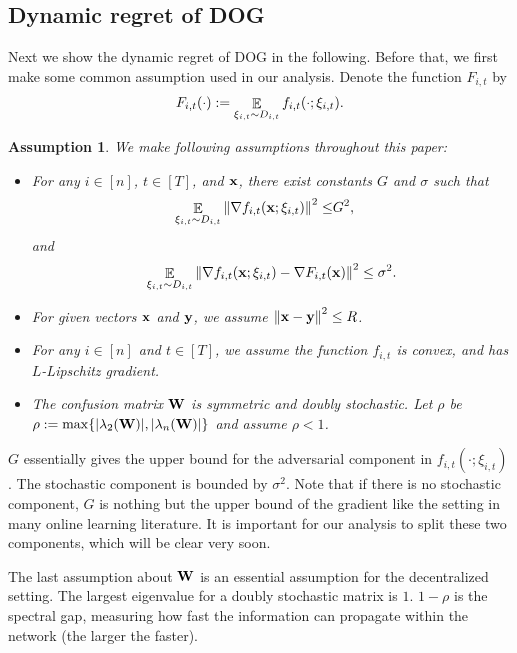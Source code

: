 \documentclass{article}
\newtheorem{Assumption}{\bf{Assumption}}
\begin{document}
\subsection{Dynamic regret of DOG}
\label{subsection_theoretical_analysis}
Next we show the dynamic regret of DOG in the following. Before that, we first make some common assumption used in our analysis. 
Denote the function $F_{i,t}$ by
\begin{align}
\nonumber
F_{i,t}(\cdot) := \mathop{\mathbb{E}}_{\xi_{i,t} \sim D_{i,t}} f_{i,t}(\cdot; \xi_{i,t}).
\end{align}

\begin{Assumption}
\label{assumption_bounded_gradient_domain}
We make following assumptions throughout this paper:
\begin{itemize}
\item For any $i\in[n]$, $t\in[T]$, and ${\bf x}$, there exist constants $G$ and $\sigma$ such that
\begin{align}
\nonumber
\mathop{\mathbb{E}}_{ \xi_{i,t} \sim D_{i,t} }\left\lVert\nabla f_{i,t}({\bf x};\xi_{i,t})\right\rVert^2 \le &  G^2,
\end{align} and 
\begin{align}
\nonumber
\mathop{\mathbb{E}}_{ \xi_{i,t} \sim D_{i,t} } \left\lVert\nabla f_{i,t}({\bf x}; \xi_{i,t}) - \nabla F_{i,t}({\bf x})\right\rVert^2 \le \sigma^2.
\end{align}
\item For given vectors ${\bf x}$ and ${\bf y}$, we assume $\left\lVert{\bf x}-{\bf y}\right\rVert^2 \le R$.
\item  For any $i\in[n]$ and $t\in[T]$, we assume the function $f_{i,t}$ is convex, and has $L$-Lipschitz gradient. 
\item The confusion matrix ${\bf W}$ is symmetric and doubly stochastic. Let $\rho$ be $\rho := \max\{ |\lambda_2({\bf W})|, |\lambda_n({\bf W})| \}$ and assume $\rho <1$.
\end{itemize}
\end{Assumption}
$G$ essentially gives the upper bound for the adversarial component in $f_{i,t}(\cdot; \xi_{i,t})$. The stochastic component is bounded by $\sigma^2$. Note that if there is no stochastic component, $G$ is nothing but the upper bound of the gradient like the setting in many online learning literature. It is important for our analysis to split these two components, which will be clear very soon. 

The last assumption about ${\bf W}$ is an essential assumption for the decentralized setting. The largest eigenvalue for a doubly stochastic matrix is $1$. $1-\rho$ is the spectral gap, measuring how fast the information can propagate within the network (the larger the faster). 
\end{document}
